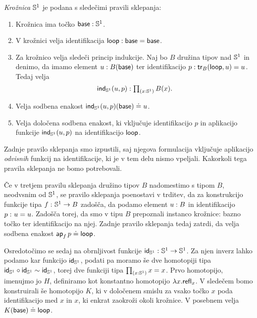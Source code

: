 \begin{definicija}
  \emph{Krožnica} \(\mathbb{S}^{1}\) je podana s sledečimi pravili sklepanja:
  \begin{enumerate}
  \item Krožnica ima točko \(\textnormal{\textsf{base}} : \mathbb{S}^{1}\).
  \item V krožnici velja identifikacija \(\textnormal{\textsf{loop}} : \textnormal{\textsf{base}} = \textnormal{\textsf{base}}\).
  \item Za krožnico velja sledeči princip indukcije. Naj bo \(B\) družina tipov nad \(\mathbb{S}^{1}\) in denimo, da imamo element \(u : B(\textnormal{\textsf{base}})\) ter identifikacijo \(p : \textnormal{\textsf{tr}}_{B}(\textnormal{\textsf{loop}}, u) = u\). Tedaj velja
    \[\textnormal{\textsf{ind}}_{\mathbb{S}^{1}}(u, p) : \textstyle \prod_{\left( x : \mathbb{S}^{1} \right)} B(x).\]
  \item Velja sodbena enakost \(\textnormal{\textsf{ind}}_{\mathbb{S}^{1}}(u, p)(\textnormal{\textsf{base}}) \doteq u\).
  \item Velja določena sodbena enakost, ki vključuje identifikacijo \(p\) in aplikacijo funkcije \(\textnormal{\textsf{ind}}_{\mathbb{S}^{1}}(u, p)\) na identifikacijo \(\textnormal{\textsf{loop}}\).
  \end{enumerate}
\end{definicija}

Zadnje pravilo sklepanja smo izpustili, saj njegova formulacija vključuje aplikacijo \emph{odvisnih} funkcij na identifikacije, ki je v tem delu nismo vpeljali. Kakorkoli tega pravila sklepanja ne bomo potrebovali.

Če v tretjem pravilu sklepanja družino tipov \(B\) nadomestimo s tipom \(B\), neodvsnim od \(\mathbb{S}^{1}\), se pravilo sklepanja poenostavi v trditev, da za konstrukcijo funkcije tipa \(f \,\colon \mathbb{S}^{1} \to B\) zadošča, da podamo element \(u : B\) in identifikacijo \(p \,\colon u = u\). Zadošča torej, da smo v tipu \(B\) prepoznali instanco krožnice: bazno točko ter identifikacijo na njej. Zadnje pravilo sklepanja tedaj zatrdi, da velja sodbena enakost \(\textnormal{\textsf{ap}}_{f}\, p \doteq \textnormal{\textsf{loop}}\).

Osredotočimo se sedaj na obrnljivost funkcije \(\textnormal{\textsf{id}}_{\mathbb{S}^{1}} \,\colon \mathbb{S}^{1} \to \mathbb{S}^{1}\). Za njen inverz lahko podamo kar funkcijo \(\textnormal{\textsf{id}}_{\mathbb{S}^{1}}\), podati pa moramo še dve homotopiji tipa \(\textnormal{\textsf{id}}_{\mathbb{S}^{1}} \circ \textnormal{\textsf{id}}_{\mathbb{S}^{1}} \sim \textnormal{\textsf{id}}_{\mathbb{S}^{1}}\), torej dve funkciji tipa \(\textstyle \prod_{\left( x : \mathbb{S}^{1} \right)} x = x\). Prvo homotopijo, imenujmo jo \(H\), definiramo kot konstantno homotopijo \(\lambda x.\textnormal{\textsf{refl}}_{x}\). V sledečem bomo konstruirali še homotopijo \(K\), ki v določenem smislu za vsako točko \(x\) poda identifikacijo med \(x\) in \(x\), ki enkrat zaokroži okoli krožnice. V posebnem velja \(K(\textnormal{\textsf{base}}) \doteq \textnormal{\textsf{loop}}\).


